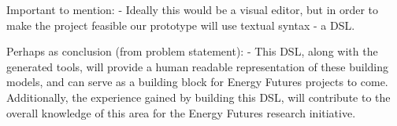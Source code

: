 Important to mention:
- Ideally this would be a visual editor, but in order to make the project feasible our prototype will use textual syntax - a DSL.

Perhaps as conclusion (from problem statement):
- This DSL, along with the generated tools, will provide a human readable representation of these building models, and can serve as a building block for Energy Futures projects to come. Additionally, the experience gained by building this DSL, will contribute to the overall knowledge of this area for the Energy Futures research initiative.